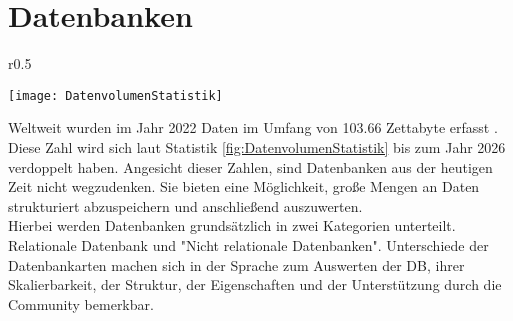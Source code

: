 \section{Datenbanken}\label{sec:Datenbank}
\begin{wrapfigure}{r}{0.5\textwidth}
    \vspace{-1.2cm}
    \begin{center}
      \texttt{[image: DatenvolumenStatistik]}
    \end{center}
    \vspace{-0.5cm}
    \caption{Volumen der weltweit generierten Daten bis 2027 \cite{Datenmengen}}
    \label{fig:DatenvolumenStatistik}
    \vspace{-0.5cm}
  \end{wrapfigure}
Weltweit wurden im Jahr 2022 Daten im Umfang von 103.66 Zettabyte erfasst \cite{Datenmengen}. Diese Zahl wird sich laut Statistik \ref{fig:DatenvolumenStatistik} bis zum Jahr 2026 verdoppelt haben. Angesicht dieser Zahlen, sind Datenbanken aus der heutigen Zeit nicht wegzudenken. Sie bieten eine Möglichkeit, große Mengen an Daten strukturiert abzuspeichern und anschließend auszuwerten.\\
Hierbei werden Datenbanken grundsätzlich in zwei Kategorien unterteilt. Relationale Datenbank und "Nicht relationale Datenbanken". Unterschiede der Datenbankarten machen sich in der Sprache zum Auswerten der DB, ihrer Skalierbarkeit, der Struktur, der Eigenschaften und der Unterstützung durch die Community bemerkbar. \cite{SQLNoSQL} 

